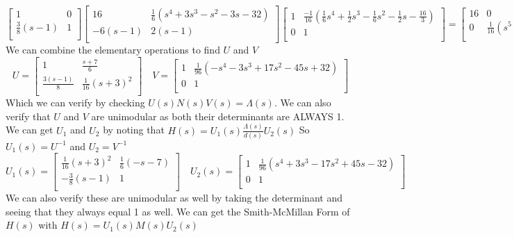 \documentclass{article}
\begin{document}
\[
\begin{bmatrix}
1 & 0\\
\frac{3}{8}(s-1) & 1\\
\end{bmatrix}
\begin{bmatrix}
16 & \frac{1}{6}(s^4 + 3s^3 -s^2 -3s - 32) \\
-6(s-1) & 2(s-1) \\
\end{bmatrix}
\begin{bmatrix}
1 & \frac{-1}{16}(\frac{1}{6}s^4+\frac{1}{2}s^3-\frac{1}{6}s^2-\frac{1}{2}s-\frac{16}{3}) \\
0 & 1 \\
\end{bmatrix}
=
\begin{bmatrix}
16 & 0 \\
0 & \frac{1}{16}(s^5+2s^4-4s^3-2s^2+3s) \\
\end{bmatrix}
\]
We can combine the elementary operations to find $U$ and $V$
\[
U =
\begin{bmatrix}
1 & \frac{s+7}{6} \\
\frac{3 (s-1)}{8} & \frac{1}{16} (s+3)^2 \\
\end{bmatrix}
\quad
V =
\begin{bmatrix}
1 & \frac{1}{96} \left(-s^4-3 s^3+17 s^2-45 s+32\right) \\
0 & 1 \\
\end{bmatrix}
\]
Which we can verify by checking $U(s)N(s)V(s) = \Lambda(s)$.
We can also verify that $U$ and $V$ are unimodular as both their determinants are ALWAYS 1.
We can get $U_1$ and $U_2$ by noting that $H(s) = U_1(s)\frac{\Lambda(s)}{d(s)}U_2(s)$
So $U_1(s) = U^{-1}$ and $U_2 = V^{-1}$
$$
U_1(s) =
\begin{bmatrix}
\frac{1}{16} (s+3)^2 & \frac{1}{6} (-s-7) \\
-\frac{3}{8} (s-1) & 1 \\
\end{bmatrix}
\quad
U_2(s) =
\begin{bmatrix}
1 & \frac{1}{96} \left(s^4+3 s^3-17 s^2+45 s-32\right) \\
0 & 1 \\
\end{bmatrix}
$$
We can also verify these are unimodular as well by taking the determinant and seeing that they always equal 1 as well.
We can get the Smith-McMillan Form of $H(s)$ with $H(s) = U_1(s) M(s) U_2(s)$
\end{document}
